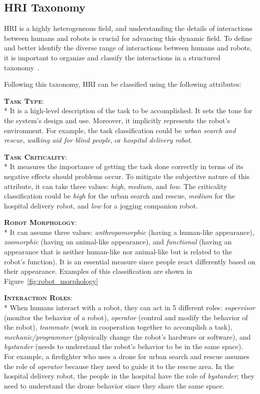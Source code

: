 \subsection{HRI Taxonomy}\label{subsec:hri_taxonomy}
HRI is a highly heterogeneous field, and understanding the details of interactions between humans and robots is crucial for advancing this dynamic field. 
To define and better identify the diverse range of interactions between humans and robots, 
it is important to organize and classify the interactions in a structured taxonomy~\cite{yanco2004taxonomy}.

Following this taxonomy, HRI can be classified using the following attributes:

{\bfseries \scshape Task Type}:\\*
It is a high-level description of the task to be accomplished. It sets the tone for the system's design and use. 
Moreover, it implicitly represents the robot's environment. 
For example, the task classification could be \textit{urban search and rescue}, \textit{walking aid for blind people}, or \textit{hospital delivery robot}.

{\bfseries \scshape Task Criticality}:\\*
It measures the importance of getting the task done correctly in terms of its negative effects should problems occur. 
To mitigate the subjective nature of this attribute, it can take three values: \textit{high}, \textit{medium}, and \textit{low}.
The criticality classification could be \textit{high} for the urban search and rescue, \textit{medium} for the hospital delivery robot, and \textit{low} for a jogging companion robot.

{\bfseries \scshape Robot Morphology}:\\*
It can assume three values: \textit{anthropomorphic} (having a human-like appearance), \textit{zoomorphic} (having an animal-like appearance), 
and \textit{functional} (having an appearance that is neither human-like nor animal-like but is related to the robot's function).
It is an essential measure since people react differently based on their appearance.
Examples of this classification are shown in Figure~\ref{fig:robot_morphology}

{\bfseries \scshape Interaction Roles}:\\*
When humans interact with a robot, they can act in 5 different roles: \textit{supervisor} (monitor the behavior of a robot), 
\textit{operator} (control and modify the behavior of the robot), \textit{teammate} (work in cooperation together to accomplish a task), 
\textit{mechanic/programmer} (physically change the robot's hardware or software), and \textit{bystander} 
(needs to understand the robot's behavior to be in the same space).
For example, a firefighter who uses a drone for urban search and rescue assumes the role of \textit{operator} because they need to guide it to the rescue area. 
In the hospital delivery robot, the people in the hospital have the role of \textit{bystander}; they need to understand the drone behavior since they share the same space.

